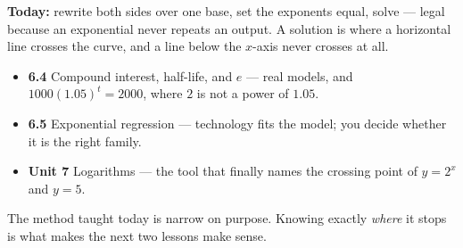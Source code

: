 \documentclass[aspectratio=169, 11pt]{beamer}
\begin{document}
\begin{frame}[t, plain]
  \textbf{Today:} rewrite both sides over one base, set the exponents equal, solve --- legal because an
  exponential never repeats an output. A solution is where a horizontal line crosses the curve, and a
  line below the $x$-axis never crosses at all.\\[8pt]
  \begin{itemize}\setlength{\itemsep}{3pt}
    \item \textbf{6.4} Compound interest, half-life, and $e$ --- real models, and $1000(1.05)^{t}=2000$, where $2$ is not a power of $1.05$.
    \item \textbf{6.5} Exponential regression --- technology fits the model; you decide whether it is the right family.
    \item \textbf{Unit 7} Logarithms --- the tool that finally names the crossing point of $y=2^{x}$ and $y=5$.
  \end{itemize}
  \vspace{6pt}
  \begin{center}
    {\footnotesize The method taught today is narrow on purpose. Knowing exactly \emph{where} it stops
    is what makes the next two lessons make sense.}
  \end{center}
\end{frame}
\end{document}
